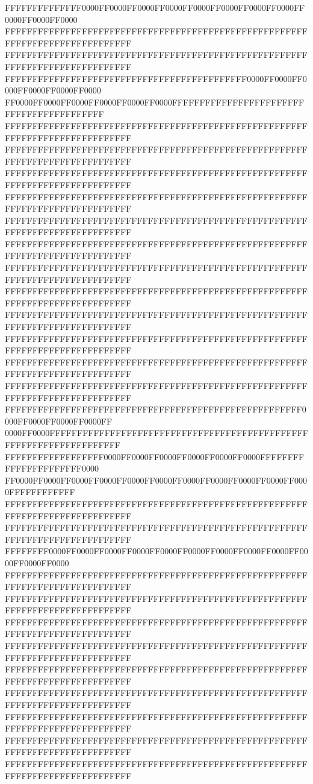 FFFFFFFFFFFFFF0000FF0000FF0000FF0000FF0000FF0000FF0000FF0000FF0000FF0000FF0000
FFFFFFFFFFFFFFFFFFFFFFFFFFFFFFFFFFFFFFFFFFFFFFFFFFFFFFFFFFFFFFFFFFFFFFFFFFFFFF
FFFFFFFFFFFFFFFFFFFFFFFFFFFFFFFFFFFFFFFFFFFFFFFFFFFFFFFFFFFFFFFFFFFFFFFFFFFFFF
FFFFFFFFFFFFFFFFFFFFFFFFFFFFFFFFFFFFFFFFFFFF0000FF0000FF0000FF0000FF0000FF0000
FF0000FF0000FF0000FF0000FF0000FF0000FFFFFFFFFFFFFFFFFFFFFFFFFFFFFFFFFFFFFFFFFF
FFFFFFFFFFFFFFFFFFFFFFFFFFFFFFFFFFFFFFFFFFFFFFFFFFFFFFFFFFFFFFFFFFFFFFFFFFFFFF
FFFFFFFFFFFFFFFFFFFFFFFFFFFFFFFFFFFFFFFFFFFFFFFFFFFFFFFFFFFFFFFFFFFFFFFFFFFFFF
FFFFFFFFFFFFFFFFFFFFFFFFFFFFFFFFFFFFFFFFFFFFFFFFFFFFFFFFFFFFFFFFFFFFFFFFFFFFFF
FFFFFFFFFFFFFFFFFFFFFFFFFFFFFFFFFFFFFFFFFFFFFFFFFFFFFFFFFFFFFFFFFFFFFFFFFFFFFF
FFFFFFFFFFFFFFFFFFFFFFFFFFFFFFFFFFFFFFFFFFFFFFFFFFFFFFFFFFFFFFFFFFFFFFFFFFFFFF
FFFFFFFFFFFFFFFFFFFFFFFFFFFFFFFFFFFFFFFFFFFFFFFFFFFFFFFFFFFFFFFFFFFFFFFFFFFFFF
FFFFFFFFFFFFFFFFFFFFFFFFFFFFFFFFFFFFFFFFFFFFFFFFFFFFFFFFFFFFFFFFFFFFFFFFFFFFFF
FFFFFFFFFFFFFFFFFFFFFFFFFFFFFFFFFFFFFFFFFFFFFFFFFFFFFFFFFFFFFFFFFFFFFFFFFFFFFF
FFFFFFFFFFFFFFFFFFFFFFFFFFFFFFFFFFFFFFFFFFFFFFFFFFFFFFFFFFFFFFFFFFFFFFFFFFFFFF
FFFFFFFFFFFFFFFFFFFFFFFFFFFFFFFFFFFFFFFFFFFFFFFFFFFFFFFFFFFFFFFFFFFFFFFFFFFFFF
FFFFFFFFFFFFFFFFFFFFFFFFFFFFFFFFFFFFFFFFFFFFFFFFFFFFFFFFFFFFFFFFFFFFFFFFFFFFFF
FFFFFFFFFFFFFFFFFFFFFFFFFFFFFFFFFFFFFFFFFFFFFFFFFFFFFFFFFFFFFFFFFFFFFFFFFFFFFF
FFFFFFFFFFFFFFFFFFFFFFFFFFFFFFFFFFFFFFFFFFFFFFFFFFFFFF0000FF0000FF0000FF0000FF
0000FF0000FFFFFFFFFFFFFFFFFFFFFFFFFFFFFFFFFFFFFFFFFFFFFFFFFFFFFFFFFFFFFFFFFFFF
FFFFFFFFFFFFFFFFFF0000FF0000FF0000FF0000FF0000FF0000FFFFFFFFFFFFFFFFFFFFFF0000
FF0000FF0000FF0000FF0000FF0000FF0000FF0000FF0000FF0000FF0000FF0000FFFFFFFFFFFF
FFFFFFFFFFFFFFFFFFFFFFFFFFFFFFFFFFFFFFFFFFFFFFFFFFFFFFFFFFFFFFFFFFFFFFFFFFFFFF
FFFFFFFFFFFFFFFFFFFFFFFFFFFFFFFFFFFFFFFFFFFFFFFFFFFFFFFFFFFFFFFFFFFFFFFFFFFFFF
FFFFFFFF0000FF0000FF0000FF0000FF0000FF0000FF0000FF0000FF0000FF0000FF0000FF0000
FFFFFFFFFFFFFFFFFFFFFFFFFFFFFFFFFFFFFFFFFFFFFFFFFFFFFFFFFFFFFFFFFFFFFFFFFFFFFF
FFFFFFFFFFFFFFFFFFFFFFFFFFFFFFFFFFFFFFFFFFFFFFFFFFFFFFFFFFFFFFFFFFFFFFFFFFFFFF
FFFFFFFFFFFFFFFFFFFFFFFFFFFFFFFFFFFFFFFFFFFFFFFFFFFFFFFFFFFFFFFFFFFFFFFFFFFFFF
FFFFFFFFFFFFFFFFFFFFFFFFFFFFFFFFFFFFFFFFFFFFFFFFFFFFFFFFFFFFFFFFFFFFFFFFFFFFFF
FFFFFFFFFFFFFFFFFFFFFFFFFFFFFFFFFFFFFFFFFFFFFFFFFFFFFFFFFFFFFFFFFFFFFFFFFFFFFF
FFFFFFFFFFFFFFFFFFFFFFFFFFFFFFFFFFFFFFFFFFFFFFFFFFFFFFFFFFFFFFFFFFFFFFFFFFFFFF
FFFFFFFFFFFFFFFFFFFFFFFFFFFFFFFFFFFFFFFFFFFFFFFFFFFFFFFFFFFFFFFFFFFFFFFFFFFFFF
FFFFFFFFFFFFFFFFFFFFFFFFFFFFFFFFFFFFFFFFFFFFFFFFFFFFFFFFFFFFFFFFFFFFFFFFFFFFFF
FFFFFFFFFFFFFFFFFFFFFFFFFFFFFFFFFFFFFFFFFFFFFFFFFFFFFFFFFFFFFFFFFFFFFFFFFFFFFF
